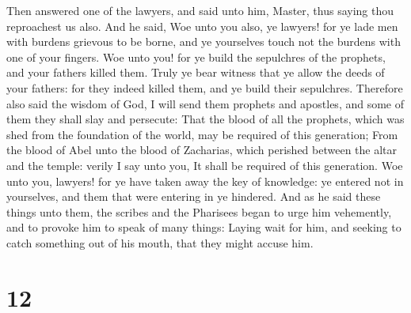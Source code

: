  Then answered one of the lawyers, and said unto him,
Master, thus saying thou reproachest us also.  And he
said, Woe unto you also, ye lawyers! for ye lade men with burdens
grievous to be borne, and ye yourselves touch not the burdens with one
of your fingers.  Woe unto you! for ye build the
sepulchres of the prophets, and your fathers killed them.
 Truly ye bear witness that ye allow the deeds of your
fathers: for they indeed killed them, and ye build their sepulchres.
 Therefore also said the wisdom of God, I will send them
prophets and apostles, and some of them they shall slay and persecute:
 That the blood of all the prophets, which was shed from
the foundation of the world, may be required of this generation;
 From the blood of Abel unto the blood of Zacharias,
which perished between the altar and the temple: verily I say unto you,
It shall be required of this generation.  Woe unto you,
lawyers! for ye have taken away the key of knowledge: ye entered not in
yourselves, and them that were entering in ye hindered. 
And as he said these things unto them, the scribes and the Pharisees
began to urge him vehemently, and to provoke him to speak of many
things:  Laying wait for him, and seeking to catch
something out of his mouth, that they might accuse him.

\hypertarget{section-11}{%
\section{12}\label{section-11}}

